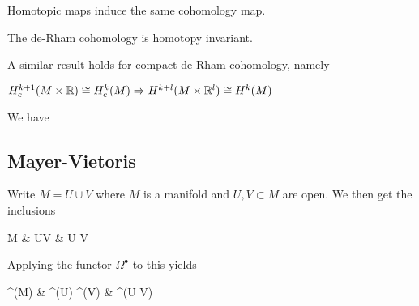 \documentclass{article}
\begin{document}
\begin{corollary}
	Homotopic maps induce the same cohomology map. 
\end{corollary}
\begin{comment}
\begin{proof}
$f,g : M \to N$ are homotopic if $\exists F:M \times I \to N$ restricting to $f,g$ at either end of the interval. Extend to a map $M \times \mbb{R}$, construct $f,g$ from $F$ using sections and pullback. 
\end{proof}
\end{comment}

\begin{corollary}
	The de-Rham cohomology is homotopy invariant. 
\end{corollary}

A similar result holds for compact de-Rham cohomology, namely

\begin{lemma}
	$H^{k+1}_c(M \times \mathbb{R}) \cong H^k_c(M) \Rightarrow H^{k+l}(M \times \mathbb{R}^l) \cong H^k(M)$
\end{lemma}

\begin{corollary}
	We have 
\end{corollary}


\subsection{Mayer-Vietoris}

Write $M = U \cup V$ where $M$ is a manifold and $U,V \subset M$ are open. We then get the inclusions 
\begin{tkz}
	M & U\coprod V \arrow[l,hook] & U \cap V  
\end{tkz}
Applying the functor $\Omega^\bullet$ to this yields
\begin{tkz}
	\Omega^\bullet(M) \arrow[r] & \Omega^\bullet(U) \oplus \Omega^\bullet(V)   & \Omega^\bullet(U \cap V) 
\end{tkz}
\end{document}
